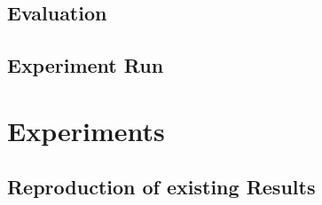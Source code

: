 \subsection{Evaluation}
\label{ch:conceptualDesign-codeExtensions-evaluation}


\subsection{Experiment Run}
\label{ch:conceptualDesign-codeExtensions-experimentRun}


\section{Experiments}

\subsection{Reproduction of existing Results}
\label{ch:conceptualDesign-existingCodeBase-reproductionOfExistingResults}
